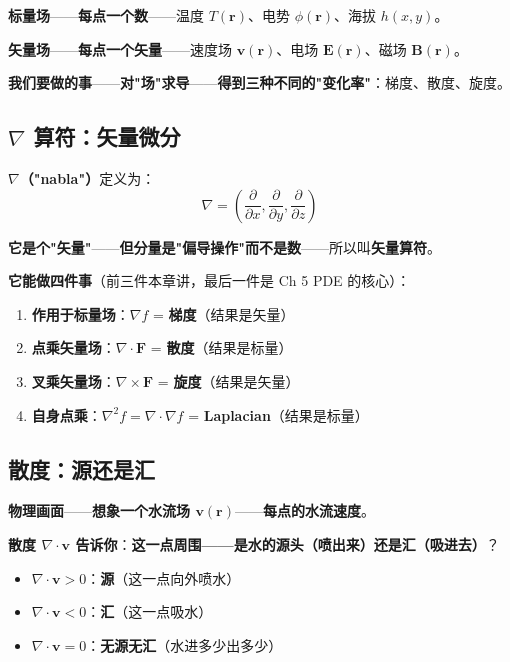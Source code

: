 \textbf{标量场}——\textbf{每点一个数}——温度 $T(\bm{r})$、电势 $\phi(\bm{r})$、海拔 $h(x,y)$。

\textbf{矢量场}——\textbf{每点一个矢量}——速度场 $\bm{v}(\bm{r})$、电场 $\bm{E}(\bm{r})$、磁场 $\bm{B}(\bm{r})$。

\textbf{我们要做的事}——\textbf{对"场"求导}——\textbf{得到三种不同的"变化率"}：梯度、散度、旋度。

\subsection{$\nabla$ 算符：矢量微分}

\textbf{$\nabla$（"nabla"）}定义为：
\[
\nabla = \left( \frac{\partial}{\partial x}, \frac{\partial}{\partial y}, \frac{\partial}{\partial z} \right)
\]

\textbf{它是个"矢量"}——\textbf{但分量是"偏导操作"而不是数}——所以叫\textbf{矢量算符}。

\textbf{它能做四件事}（前三件本章讲，最后一件是 Ch 5 PDE 的核心）：

\begin{enumerate}
\item \textbf{作用于标量场}：$\nabla f$ = \textbf{梯度}（结果是矢量）
\item \textbf{点乘矢量场}：$\nabla \cdot \bm{F}$ = \textbf{散度}（结果是标量）
\item \textbf{叉乘矢量场}：$\nabla \times \bm{F}$ = \textbf{旋度}（结果是矢量）
\item \textbf{自身点乘}：$\nabla^2 f = \nabla \cdot \nabla f$ = \textbf{Laplacian}（结果是标量）
\end{enumerate}

\subsection{散度：源还是汇}

\textbf{物理画面}——\textbf{想象一个水流场 $\bm{v}(\bm{r})$}——\textbf{每点的水流速度}。

\textbf{散度 $\nabla \cdot \bm{v}$ 告诉你}：\textbf{这一点周围——是水的源头（喷出来）还是汇（吸进去）}？

\begin{itemize}
\item $\nabla \cdot \bm{v} > 0$：\textbf{源}（这一点向外喷水）
\item $\nabla \cdot \bm{v} < 0$：\textbf{汇}（这一点吸水）
\item $\nabla \cdot \bm{v} = 0$：\textbf{无源无汇}（水进多少出多少）
\end{itemize}

